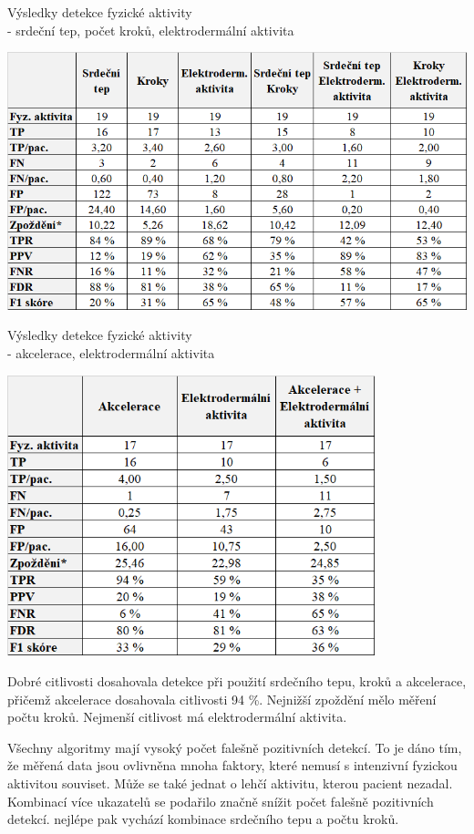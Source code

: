 \begin{table}[H]
\caption{Výsledky detekce fyzické aktivity\\ - srdeční tep, počet kroků, elektrodermální aktivita}
\label{tab:res_heart}
\includegraphics[width=1\textwidth]{img/vysledky/pa/vysledky 1.png}
\end{table}

\begin{table}[H]
\caption{Výsledky detekce fyzické aktivity\\ - akcelerace, elektrodermální aktivita}
\label{tab:res_acc}
\includegraphics[width=0.8\textwidth]{img/vysledky/pa/vysledky 2.png}
\end{table}

Dobré citlivosti dosahovala detekce při použití srdečního tepu, kroků a akcelerace, přičemž akcelerace dosahovala citlivosti 94 \%. Nejnižší zpoždění mělo měření počtu kroků. Nejmenší citlivost má elektrodermální aktivita.

Všechny algoritmy mají vysoký počet falešně pozitivních detekcí. To je dáno tím, že měřená data jsou ovlivněna mnoha faktory, které nemusí s intenzivní fyzickou aktivitou souviset. Může se také jednat o lehčí aktivitu, kterou pacient nezadal. Kombinací více ukazatelů se podařilo značně snížit počet falešně pozitivních detekcí. nejlépe pak vychází kombinace srdečního tepu a počtu kroků.

